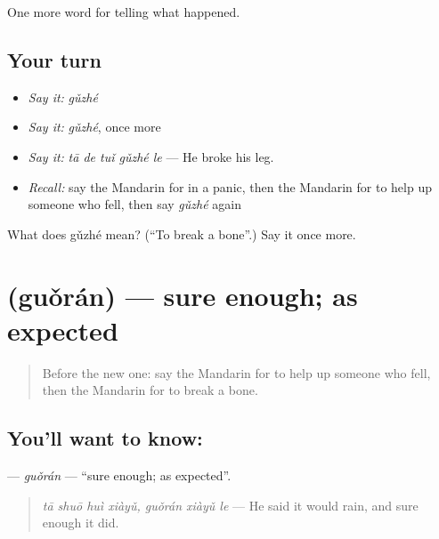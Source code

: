 \begin{grammarlens}[title={What you've built}]
One more word for telling what happened.
\end{grammarlens}

\subsection*{Your turn}
\begin{itemize}
\raggedright
  \item \emph{Say it:} \emph{gǔzhé}
  \item \emph{Say it:} \emph{gǔzhé}, once more
  \item \emph{Say it:} \emph{tā de tuǐ gǔzhé le} — He broke his leg.
  \item \emph{Recall:} say the Mandarin for in a panic, then the Mandarin for to help up someone who fell, then say \emph{gǔzhé} again
\end{itemize}

\begin{tcolorbox}[breakable,colback=teal!4,colframe=teal!35!black,title={Before you move on}]
What does gǔzhé mean? (\textquotedblleft{}To break a bone\textquotedblright{}.) Say it once more.
\end{tcolorbox}
\section[\texorpdfstring{\zh{果然} (guǒrán)}{果然 (guǒrán)}]{ (guǒrán) — sure enough; as expected}

\label{lesson:ZH-C301-guoran}



\begin{quote}
Before the new one: say the Mandarin for to help up someone who fell, then the Mandarin for to break a bone.
\end{quote}

\subsection*{You'll want to know: }
\textbf{} — \emph{guǒrán} — \textquotedblleft{}sure enough; as expected\textquotedblright{}.

\begin{quote}
\textbf{} \emph{tā shuō huì xiàyǔ, guǒrán xiàyǔ le} — He said it would rain, and sure enough it did.
\end{quote}

